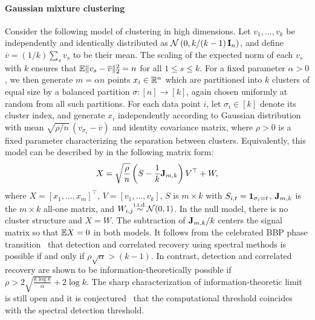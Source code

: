 

\paragraph*{Gaussian mixture clustering}
Consider the following model of clustering in high dimensions. 
Let $v_1,...,v_k$ be independently and identically distributed as ${\mathcal{N}} \left(0, k/(k-1) \, \mathbf I_{n} \right)$,
 and define $\overline v = (1/k)\sum_{s} v_s$ to be their mean. The scaling of the expected norm of each $v_s$ with $k$ ensures that $\mathbb{E} \|v_s - \overline{v} \|_2^2 =n$ for all $1 \le s \le k$. For a fixed parameter $\alpha>0$, we then generate $m = \alpha n$ points $x_i \in {\mathbb{R}}^n$ which are partitioned into $k$ clusters of equal size by a balanced partition $\sigma:[n]\to[k]$, again chosen uniformly at random from all such partitions. For each data point $i$, let $\sigma_i \in [k]$ denote its cluster index, and generate $x_i$ independently according to Gaussian distribution with mean $\sqrt{\rho/n}\, (v_{\sigma_i} - \overline v)$ and identity covariance matrix, where  $\rho>0$ is a fixed parameter characterizing the separation between clusters. 
Equivalently, this model can be described by in the following matrix form:
\begin{align} \label{eq:clustering_def}
	X = \sqrt{\frac{\rho}{ n}} \left(S - \frac{1}{k}\mathbf J_{m,k}\right) V^\top + W,
\end{align}
where $X=[x_1,\ldots,x_m]^\top$, $V = [v_1, ..., v_k ]$, $S$ is $m \times k$ with $S_{i,t} = \bm{1}_{\sigma_i = t}$, 
$\mathbf J_{m,k}$ is the $m\times k$ all-one matrix,  and $W_{i,j} {\stackrel{\text{i.i.d.}}{\sim}} {\mathcal{N}}(0,1)$.
  In the null model, there is no cluster structure and $X = W$. 
The subtraction of $\mathbf J_{m,k}/k$ centers the signal matrix so that $\mathbb{E} X = 0$ in both models. 
It follows from the celebrated BBP phase transition~\cite{baik2005phase,Paul07} that detection
and correlated recovery using spectral methods is possible if and only if $\rho \sqrt{\alpha} >(k-1) $. 
In contrast, detection and correlated recovery are shown to be information-theoretically 
possible if $\rho > 2\sqrt{ \frac{k \log k}{\alpha} } + 2\log k $. The sharp characterization of
information-theoretic limit is still open and it is conjectured~\cite{clustering} that the computational threshold
coincides with the spectral detection threshold. 








